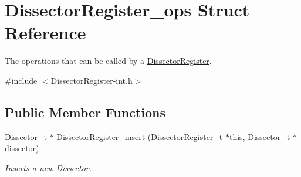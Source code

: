 \hypertarget{struct_dissector_register__ops}{\section{Dissector\-Register\-\_\-ops Struct Reference}
\label{struct_dissector_register__ops}
}


The operations that can be called by a \hyperlink{struct_dissector_register}{Dissector\-Register}.  




{\ttfamily \#include $<$Dissector\-Register-\/int.\-h$>$}

\subsection*{Public Member Functions}
\begin{DoxyCompactItemize}
\item 
\hyperlink{struct_dissector}{Dissector\-\_\-t} $\ast$ \hyperlink{struct_dissector_register__ops_a8446d3a1c7fab1257da22cbede148d68}{Dissector\-Register\-\_\-insert} (\hyperlink{struct_dissector_register}{Dissector\-Register\-\_\-t} $\ast$this, \hyperlink{struct_dissector}{Dissector\-\_\-t} $\ast$dissector)
\begin{DoxyCompactList}\small\item\em Inserts a new \hyperlink{struct_dissector}{Dissector}. \end{DoxyCompactList}\end{DoxyCompactItemize}
